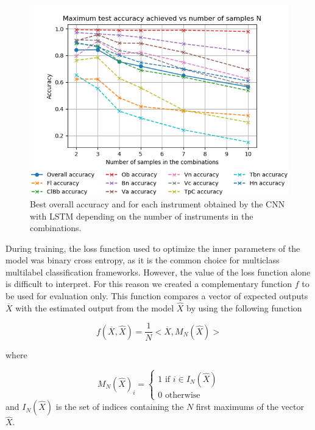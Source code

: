 \documentclass{article}
\begin{document}
\begin{figure}
\begin{center}
\includegraphics[scale=0.4]{figs/Acc_vs_N_CNN.png}
\caption{Best overall accuracy and for each instrument obtained by the CNN with LSTM depending on the number of instruments in the combinations. \label{best_acc_cnn}}
\end{center}
\end{figure}

During training, the loss function used to optimize the inner parameters of the model was binary cross entropy, as it is the common choice for multiclass multilabel classification frameworks. However, the value of the loss function alone is difficult to interpret. For this reason we created a complementary function $f$ to be used for evaluation only. This function compares a vector of expected outputs $\overline{X}$ with the estimated output from the model $\hat{X}$ by using the following function

\begin{equation}
f(\overline{X}, \hat{X}) = \frac{1}{N}<\overline{X}, M_N(\hat{X})>
\label{eval}
\end{equation}

where

\begin{equation}
M_N(\hat{X})_i = \left\{\begin{array}{ll}
1 \text{ if } i \in I_N(\hat{X})\\
0 \text{ otherwise}
\end{array}\right.
\label{NMax}
\end{equation}
and $I_N(\hat{X})$ is the set of indices containing the $N$ first maximums of the vector $\hat{X}$.
\end{document}
